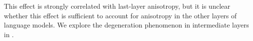 This effect is strongly correlated with last-layer anisotropy, but it is unclear whether this effect is sufficient to account for anisotropy in the other layers of language models. We explore the degeneration phenomenon in intermediate layers in .














